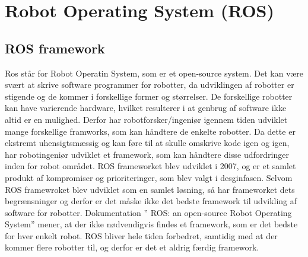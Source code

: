 \chapter{Robot Operating System (ROS)}\label{chap:ROS}
\section{ROS framework}
Ros står for Robot Operatin System, som er et open-source system. Det kan være svært at skrive software programmer for robotter, da udviklingen af robotter er stigende og de kommer i forskellige former og størrelser. De forskellige robotter kan have varierende hardware, hvilket resulterer i at genbrug af software ikke altid er en mulighed. Derfor har robotforsker/ingeniør igennem tiden udviklet mange forskellige framworks, som kan håndtere de enkelte robotter. Da dette er ekstremt uhensigtsmæssig og kan føre til at skulle omskrive kode igen og igen, har robotingeniør udviklet et framework, som kan håndtere disse udfordringer inden for robot området. ROS frameworket blev udviklet i 2007, og er et samlet produkt af kompromiser og prioriteringer, som blev valgt i desginfasen. Selvom ROS framewroket blev udviklet som en samlet løsning, så har frameworket dets begrænsninger og derfor er det måske ikke det bedste framework til udvikling af software for robotter. Dokumentation ” ROS: an open-source Robot Operating System” mener, at der ikke nødvendigvis findes et framework, som er det bedste for hver enkelt robot. ROS bliver hele tiden forbedret, samtidig med at der kommer flere robotter til, og derfor er det et aldrig færdig framework. \newline
